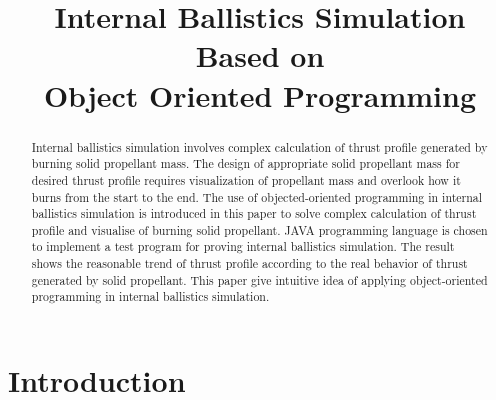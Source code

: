 \documentclass[conference]{IEEEtran}
\begin{document}
\title{Internal Ballistics Simulation Based on \\Object Oriented Programming}

\author{
\and
{}
}









\maketitle


\begin{abstract}
Internal ballistics simulation involves complex calculation of thrust profile generated by burning solid propellant mass. The design of appropriate solid propellant mass for desired thrust profile requires visualization of propellant mass and overlook how it burns from the start to the end. The use of objected-oriented programming in internal ballistics simulation is introduced in this paper to solve complex calculation of thrust profile and visualise of burning solid propellant. JAVA programming language is chosen to implement a test program for proving internal ballistics simulation. The result shows the reasonable trend of thrust profile according to the real behavior of thrust generated by solid propellant. This paper give intuitive idea of applying object-oriented programming in internal ballistics simulation.
\end{abstract}

\IEEEpeerreviewmaketitle



\section{Introduction}
\end{document}
